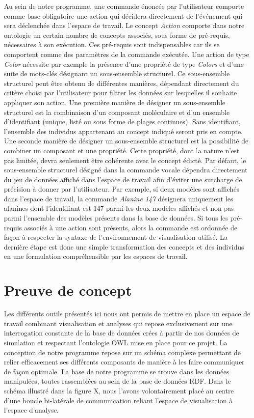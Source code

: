 Au sein de notre programme, une commande énoncée par l'utilisateur comporte comme base obligatoire une action qui décidera directement de l'événement qui sera déclenchée dans l'espace de travail. Le concept \textit{Action} comporte dans notre ontologie un certain nombre de concepts associés, sous forme de pré-requis, nécessaires à son exécution. Ces pré-requis sont indispensables car ils se comportent comme des paramètres de la commande exécutée. Une action de type \textit{Color} nécessite par exemple la présence d'une propriété de type \textit{Colors} et d'une suite de mots-clés désignant un sous-ensemble structurel. Ce sous-ensemble structurel peut être obtenu de différentes manières, dépendant directement du critère choisi par l'utilisateur pour filtrer les données sur lesquelles il souhaite appliquer son action. Une première manière de désigner un sous-ensemble structurel est la combinaison d'un composant moléculaire et d'un ensemble d'identifiant (unique, listé ou sous forme de plages continues). Sans identifiant, l'ensemble des individus appartenant au concept indiqué seront pris en compte. Une seconde manière de désigner un sous-ensemble structurel est la possibilité de combiner un composant et une propriété. Cette propriété, dont la nature n'est pas limitée, devra seulement être cohérente avec le concept édicté.
Par défaut, le sous-ensemble structurel désigné dans la commande vocale dépendra directement du jeu de données affiché dans l'espace de travail afin d'éviter une surcharge de précision à donner par l'utilisateur. Par exemple, si deux modèles sont affichés dans l'espace de travail, la commande \textit{Alanine 147} désignera uniquement les alanines dont l'identifiant est 147 parmi les deux modèles affichés et non pas parmi l'ensemble des modèles présents dans la base de données.
Si tous les pré-requis associés à une action sont présents, alors la commande est ordonnée de façon à respecter la syntaxe de l'environnement de visualisation utilisé. La dernière étape est donc une simple transformation des concepts et des individus en une formulation compréhensible par les espaces de travail.


\section{Preuve de concept}

Les différents outils présentés ici nous ont permis de mettre en place un espace de travail combinant visualisation et analyses qui repose exclusivement sur une interrogation constante de la base de données crées à partir de nos données de simulation et respectant l'ontologie OWL mise en place pour ce projet.
La conception de notre programme repose sur un schéma complexe permettant de relier efficacement ses différents composants de manière à les faire communiquer de façon optimale. La base de notre programme se trouve dans les données manipulées, toutes rassemblées au sein de la base de données RDF. Dans le schéma illustré dans la figure X, nous l'avons volontairement placé au centre d'une boucle bi-latérale de communication reliant l'espace de visualisation à l'espace d'analyse.

